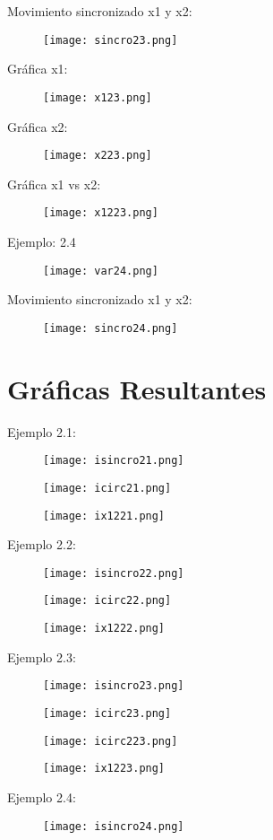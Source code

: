 \documentclass{article}
\begin{document}
Movimiento sincronizado x1 y x2:
\begin{figure}[H]
\texttt{[image: sincro23.png]}
\end{figure}
Gráfica x1:
\begin{figure}[H]
\texttt{[image: x123.png]}
\end{figure}
Gráfica x2:
\begin{figure}[H]
\texttt{[image: x223.png]}
\end{figure}
Gráfica x1 vs x2:
\begin{figure}[H]
\texttt{[image: x1223.png]}
\end{figure}
Ejemplo: 2.4
\begin{figure}[H]
\texttt{[image: var24.png]}
\end{figure}
Movimiento sincronizado x1 y x2:
\begin{figure}[H]
\texttt{[image: sincro24.png]}
\end{figure}
\section{Gráficas Resultantes}
Ejemplo 2.1:
\begin{figure}[H]
\texttt{[image: isincro21.png]}
\end{figure}
\begin{figure}[H]
\texttt{[image: icirc21.png]}
\end{figure}
\begin{figure}[H]
\texttt{[image: ix1221.png]}
\end{figure}
Ejemplo 2.2:
\begin{figure}[H]
\texttt{[image: isincro22.png]}
\end{figure}
\begin{figure}[H]
\texttt{[image: icirc22.png]}
\end{figure}
\begin{figure}[H]
\texttt{[image: ix1222.png]}
\end{figure}
Ejemplo 2.3:
\begin{figure}[H]
\texttt{[image: isincro23.png]}
\end{figure}
\begin{figure}[H]
\texttt{[image: icirc23.png]}
\end{figure}
\begin{figure}[H]
\texttt{[image: icirc223.png]}
\end{figure}
\begin{figure}[H]
\texttt{[image: ix1223.png]}
\end{figure}
Ejemplo 2.4:
\begin{figure}[H]
\texttt{[image: isincro24.png]}
\end{figure}
\end{document}
